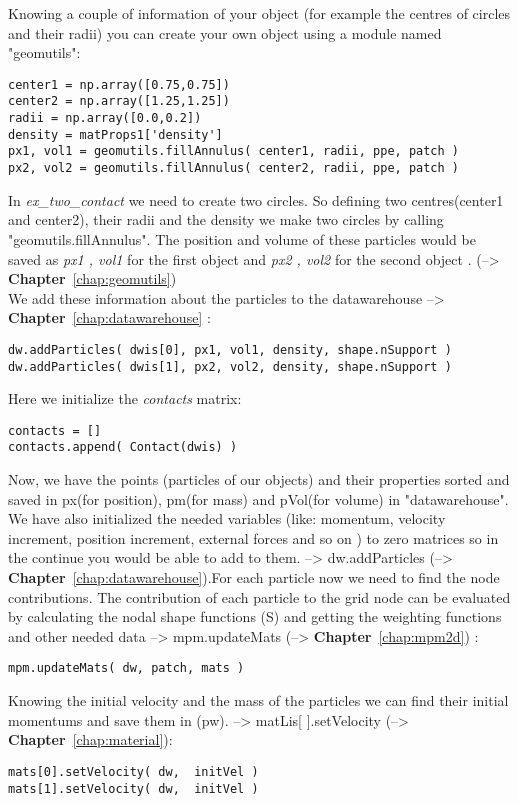Knowing a couple of information of your object (for example the centres of circles and their radii) you can create your own object using a module named "geomutils":
\begin{lstlisting}
center1 = np.array([0.75,0.75])
center2 = np.array([1.25,1.25])
radii = np.array([0.0,0.2])
density = matProps1['density']
px1, vol1 = geomutils.fillAnnulus( center1, radii, ppe, patch )
px2, vol2 = geomutils.fillAnnulus( center2, radii, ppe, patch )
\end{lstlisting}

In \emph{ex\_two\_contact} we need to create two circles. So defining two centres(center1 and center2), their radii and the density we make two circles by calling "geomutils.fillAnnulus". The position and volume of these particles would be saved as \emph{px1 , vol1} for the first object and \emph{px2 , vol2} for the second object . (--> \textbf{Chapter}~\ref{chap:geomutils})\\
We add these information about the particles to the datawarehouse --> \textbf{Chapter}~\ref{chap:datawarehouse} :
\begin{lstlisting}
dw.addParticles( dwis[0], px1, vol1, density, shape.nSupport )
dw.addParticles( dwis[1], px2, vol2, density, shape.nSupport )
\end{lstlisting}


Here we initialize the \emph{contacts} matrix:
\begin{lstlisting}
contacts = []
contacts.append( Contact(dwis) )
\end{lstlisting}

Now, we have the points (particles of our objects) and their properties sorted and saved in px(for position), pm(for mass) and pVol(for volume) in "datawarehouse". We have also initialized the needed variables (like: momentum, velocity increment, position increment, external forces and so on ) to zero matrices so in the continue you would be able to add to them. --> dw.addParticles (--> \textbf{Chapter}~\ref{chap:datawarehouse}).For each particle now we need to find the node contributions. The contribution of each particle to the grid node can be evaluated by calculating the nodal shape functions (S) and getting the weighting functions and other needed data --> mpm.updateMats (--> \textbf{Chapter}~\ref{chap:mpm2d}) :
\begin{lstlisting}
mpm.updateMats( dw, patch, mats )
\end{lstlisting}

Knowing the initial velocity and the mass of the particles we can find their initial momentums and save them in (pw). --> matLis[ ].setVelocity (--> \textbf{Chapter}~\ref{chap:material}):
\begin{lstlisting}
mats[0].setVelocity( dw,  initVel )
mats[1].setVelocity( dw,  initVel )
\end{lstlisting}

